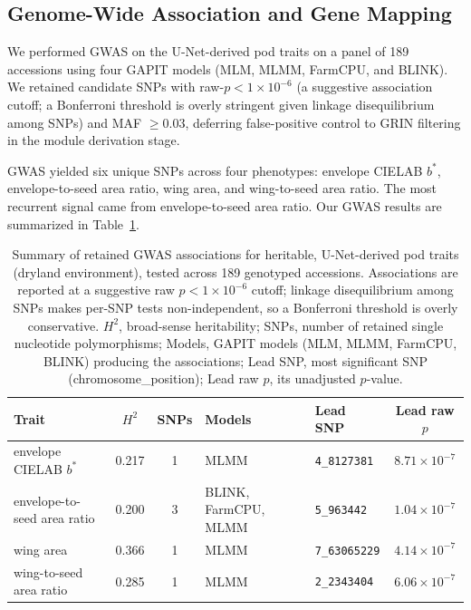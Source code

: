 \subsection{Genome-Wide Association and Gene Mapping}
We performed GWAS on the U-Net-derived pod traits on a panel of 189 accessions using four GAPIT models (MLM, MLMM, FarmCPU, and BLINK). We retained candidate SNPs with raw-$p < 1 \times 10^{-6}$ (a suggestive association cutoff; a Bonferroni threshold is overly stringent given linkage disequilibrium among SNPs) and MAF $\geq 0.03$, deferring false-positive control to GRIN filtering in the module derivation stage.

GWAS yielded six unique SNPs across four phenotypes: envelope CIELAB $b^*$, envelope-to-seed area ratio, wing area, and wing-to-seed area ratio. The most recurrent signal came from envelope-to-seed area ratio. Our GWAS results are summarized in Table~\ref{tab:ch2-gwas-results}.

\begin{table}[htbp]
 \centering
 \caption[Summary of retained GWAS associations for heritable, U-Net-derived pod traits]{Summary of retained GWAS associations for heritable, U-Net-derived pod traits (dryland environment), tested across 189 genotyped accessions. Associations are reported at a suggestive raw $p < 1\times10^{-6}$ cutoff; linkage disequilibrium among SNPs makes per-SNP tests non-independent, so a Bonferroni threshold is overly conservative. $H^2$, broad-sense heritability; SNPs, number of retained single nucleotide polymorphisms; Models, GAPIT models (MLM, MLMM, FarmCPU, BLINK) producing the associations; Lead SNP, most significant SNP (chromosome\_position); Lead raw $p$, its unadjusted $p$-value.}\label{tab:ch2-gwas-results}
 \small
 \setlength{\tabcolsep}{3.5pt}
 \renewcommand{\arraystretch}{1.1}
 \begin{tabularx}{\textwidth}{@{}>{\raggedright\arraybackslash}p{} c c >{\raggedright\arraybackslash}X l c@{}}
 \toprule
 Trait & $H^2$ & SNPs & Models & Lead SNP & Lead raw $p$ \\
 \midrule
 envelope CIELAB $b^*$
 & 0.217 & 1 & MLMM & \texttt{4\_8127381} & $8.71 \times 10^{-7}$ \\

 envelope-to-seed area ratio
 & 0.200 & 3 & BLINK, FarmCPU, MLMM & \texttt{5\_963442} & $1.04 \times 10^{-7}$ \\

 wing area
 & 0.366 & 1 & MLMM & \texttt{7\_63065229} & $4.14 \times 10^{-7}$ \\

 wing-to-seed area ratio
 & 0.285 & 1 & MLMM & \texttt{2\_2343404} & $6.06 \times 10^{-7}$ \\
 \bottomrule
 \end{tabularx}
\end{table}

